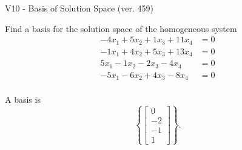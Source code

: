 \begin{exercise}
  \begin{exerciseTitle}V10 - Basis of Solution Space (ver. 459)\end{exerciseTitle}
  \begin{exerciseStatement}
    Find a basis for the solution space of the homogeneous system 
\begin{align*}
 -4 x_ 1 + 5 x_ 2 + 1 x_ 3 + 11 x_ 4 &= 0  \\ 
  -1 x_ 1 + 4 x_ 2 + 5 x_ 3 + 13 x_ 4 &= 0  \\ 
  5 x_ 1 -1 x_ 2 -2 x_ 3 -4 x_ 4 &= 0  \\ 
  -5 x_ 1 -6 x_ 2 + 4 x_ 3 -8 x_ 4 &= 0  \\ 
 \end{align*}


 
  \end{exerciseStatement}

  \begin{exerciseAnswer}
   A basis is   
\[\left\{\left[\begin{array}{c}
0 \\
-2 \\
-1 \\
1
\end{array}\right]\right\}.\]

  


  \end{exerciseAnswer}
\end{exercise}
